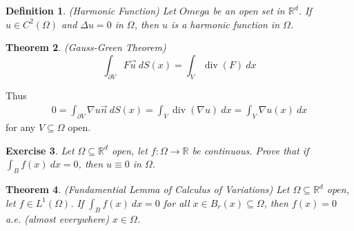 \documentclass{report}
\theoremstyle{tommy}
\newtheorem{defn}{Definition}
\newtheorem{thm}[defn]{Theorem}
\newtheorem{ex}[defn]{Exercise}
\renewcommand\div{\operatorname{div}}
\begin{document}
\begin{defn} (Harmonic Function)
  Let \(Omega\) be an open set in \(\mathbb{R}^d\). If \(u \in C^2(\Omega)\) and \(\Delta u = 0\) in \(\Omega\), then \(u\) is a harmonic function in \(\Omega\).
\end{defn}

\begin{thm} (Gauss-Green Theorem)
  \[ \int_{\partial V} F \vec{u}\ dS(x) = \int_V \div(F)\ dx \]
\end{thm}
Thus
\begin{align*}
  0 = \int_{\partial V} \nabla u \vec{n}\ dS(x)
  = \int_V \div(\nabla u) \ dx
  = \int_V \nabla u(x) \ dx
\end{align*}
for any \(V \subseteq \Omega \) open.

\begin{ex}
Let \(\Omega \subseteq \mathbb{R}^d\) open, let \(f: \Omega \to \mathbb{R}\) be continuous. Prove that if \( \int_B f(x) \ dx = 0 \), then \( u \equiv 0 \) in \(\Omega\).
\end{ex}

\begin{thm} (Fundamential Lemma of Calculus of Variations)
  Let \(\Omega \subseteq \mathbb{R}^d\) open, let \(f \in L^1(\Omega)\). If 
  \(\int_B f(x) \ dx = 0\) for all \(x \in B_r(x) \subseteq \Omega\), then \(f(x) = 0\) a.e. (almost everywhere) \(x \in \Omega\).
\end{thm}
\end{document}
